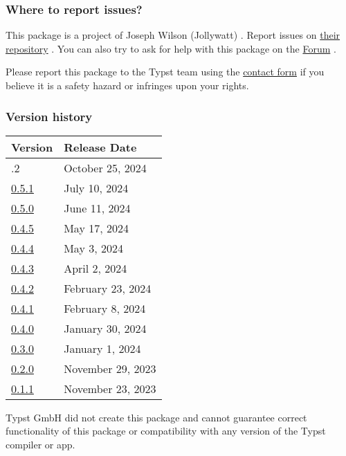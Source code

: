 \subsubsection{Where to report issues?}\label{where-to-report-issues}

This package is a project of Joseph Wilson (Jollywatt) . Report issues
on \href{https://github.com/Jollywatt/typst-fletcher}{their repository}
. You can also try to ask for help with this package on the
\href{https://forum.typst.app}{Forum} .

Please report this package to the Typst team using the
\href{https://typst.app/contact}{contact form} if you believe it is a
safety hazard or infringes upon your rights.

\label{versions}
\subsubsection{Version history}\label{version-history}

\begin{longtable}[]{@{}ll@{}}
\toprule\noalign{}
Version & Release Date \\
\midrule\noalign{}
\endhead
\bottomrule\noalign{}
\endlastfoot
0.5.2 & October 25, 2024 \\
\href{https://typst.app/universe/package/fletcher/0.5.1/}{0.5.1} & July
10, 2024 \\
\href{https://typst.app/universe/package/fletcher/0.5.0/}{0.5.0} & June
11, 2024 \\
\href{https://typst.app/universe/package/fletcher/0.4.5/}{0.4.5} & May
17, 2024 \\
\href{https://typst.app/universe/package/fletcher/0.4.4/}{0.4.4} & May
3, 2024 \\
\href{https://typst.app/universe/package/fletcher/0.4.3/}{0.4.3} & April
2, 2024 \\
\href{https://typst.app/universe/package/fletcher/0.4.2/}{0.4.2} &
February 23, 2024 \\
\href{https://typst.app/universe/package/fletcher/0.4.1/}{0.4.1} &
February 8, 2024 \\
\href{https://typst.app/universe/package/fletcher/0.4.0/}{0.4.0} &
January 30, 2024 \\
\href{https://typst.app/universe/package/fletcher/0.3.0/}{0.3.0} &
January 1, 2024 \\
\href{https://typst.app/universe/package/fletcher/0.2.0/}{0.2.0} &
November 29, 2023 \\
\href{https://typst.app/universe/package/fletcher/0.1.1/}{0.1.1} &
November 23, 2023 \\
\end{longtable}

Typst GmbH did not create this package and cannot guarantee correct
functionality of this package or compatibility with any version of the
Typst compiler or app.
